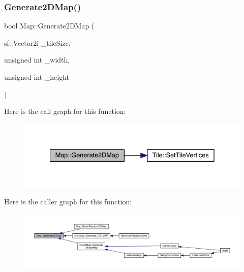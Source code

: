 \mbox{\label{class_map_a6e7c6b33a4b312d325eb7079f651b414}} 
\subsubsection{\texorpdfstring{Generate2\+D\+Map()}{Generate2DMap()}}
{\footnotesize\ttfamily bool Map\+::\+Generate2\+D\+Map (\begin{DoxyParamCaption}\item[{sf\+::\+Vector2i}]{\+\_\+tile\+Size,  }\item[{unsigned int}]{\+\_\+width,  }\item[{unsigned int}]{\+\_\+height }\end{DoxyParamCaption})}

Here is the call graph for this function\+:
\nopagebreak
\begin{figure}[H]
\begin{center}
\leavevmode
\includegraphics[width=335pt]{dd/d11/class_map_a6e7c6b33a4b312d325eb7079f651b414_cgraph}
\end{center}
\end{figure}
Here is the caller graph for this function\+:
\nopagebreak
\begin{figure}[H]
\begin{center}
\leavevmode
\includegraphics[width=350pt]{dd/d11/class_map_a6e7c6b33a4b312d325eb7079f651b414_icgraph}
\end{center}
\end{figure}
\mbox{\label{class_map_a9fe61ffc95d4fc4bed052ead1c06221a}} 
